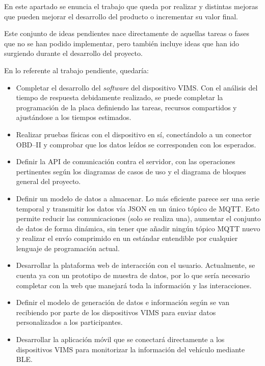 En este apartado se enuncia el trabajo que queda por realizar y distintas mejoras
que pueden mejorar el desarrollo del producto o incrementar su valor final.

Este conjunto de ideas pendientes nace directamente de aquellas tareas o fases
que no se han podido implementar, pero también incluye ideas que han ido
surgiendo durante el desarrollo del proyecto.

En lo referente al trabajo pendiente, quedaría:

\begin{itemize}
  \item Completar el desarrollo del \textit{software} del dispositivo \ac{VIMS}.
        Con el análisis del tiempo de respuesta debidamente realizado, se
        puede completar la programación de la placa definiendo las tareas,
        recursos compartidos y ajustándose a los tiempos estimados.
  \item Realizar pruebas físicas con el dispositivo en sí, conectándolo a un
        conector \ac{OBD}--II y comprobar que los datos leídos se corresponden
        con los esperados.
  \item Definir la \ac{API} de comunicación contra el servidor, con las operaciones
        pertinentes según los diagramas de casos de uso y el diagrama de bloques
        general del proyecto.
  \item Definir un modelo de datos a almacenar. Lo más eficiente parece ser una
        serie temporal y transmitir los datos vía JSON en un único tópico de
        MQTT. Esto permite reducir las comunicaciones (solo se realiza una),
        aumentar el conjunto de datos de forma dinámica, sin tener que añadir
        ningún tópico MQTT nuevo y realizar el envío comprimido en un estándar
        entendible por cualquier lenguaje de programación actual.
  \item Desarrollar la plataforma web de interacción con el usuario. Actualmente,
        se cuenta ya con un prototipo de muestra de datos, por lo que sería necesario
        completar con la web que manejará toda la información y las interacciones.
  \item Definir el modelo de generación de datos e información según se van recibiendo
        por parte de los dispositivos \ac{VIMS} para enviar datos personalizados
        a los participantes.
  \item Desarrollar la aplicación móvil que se conectará directamente a los
        dispositivos \ac{VIMS} para monitorizar la información del vehículo
        mediante \ac{BLE}.
\end{itemize}

